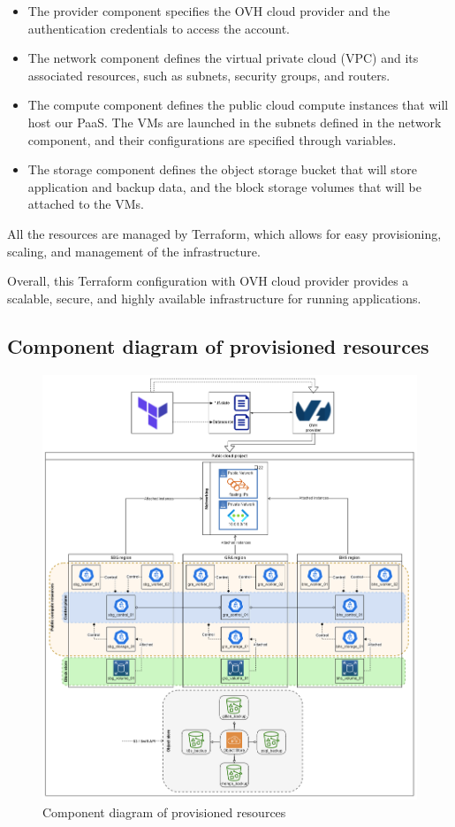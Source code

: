\begin{itemize}[label={--}]
\item The provider component specifies the OVH cloud provider and the authentication credentials to access the account. 
\item The network component defines the virtual private cloud (VPC) and its associated resources, such as subnets, security groups, and routers. 
\item The compute component defines the public cloud compute instances that will host our PaaS. The VMs are launched in the subnets defined in the network component, and their configurations are specified through variables. 
\item The storage component defines the object storage bucket that will store application and backup data, and the block storage volumes that will be attached to the VMs. 
\end{itemize}

\hspace{7mm}All the resources are managed by Terraform, which allows for easy provisioning, scaling, and management of the infrastructure. 

\hspace{7mm}Overall, this Terraform configuration with OVH cloud provider provides a scalable, secure, and highly available infrastructure for running applications. 

\subsection{Component diagram of provisioned resources}

\begin{figure}[H]\centering
\includegraphics[width=1.0\textwidth,angle=00]{assets/f15.png}
\caption{Component diagram of provisioned resources}
\label{fig:fig15}
\end{figure}

